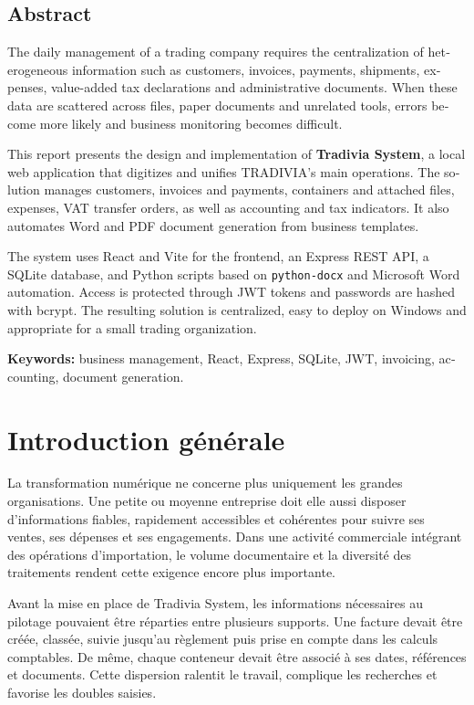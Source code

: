\documentclass[12pt,a4paper,oneside]{report}
\newcommand{\code}[1]{\texttt{#1}}
\begin{document}
\begin{otherlanguage}{english}
\chapter*{Abstract}
The daily management of a trading company requires the centralization of heterogeneous information such as customers, invoices, payments, shipments, expenses, value-added tax declarations and administrative documents. When these data are scattered across files, paper documents and unrelated tools, errors become more likely and business monitoring becomes difficult.

This report presents the design and implementation of \textbf{Tradivia System}, a local web application that digitizes and unifies TRADIVIA's main operations. The solution manages customers, invoices and payments, containers and attached files, expenses, VAT transfer orders, as well as accounting and tax indicators. It also automates Word and PDF document generation from business templates.

The system uses React and Vite for the frontend, an Express REST API, a SQLite database, and Python scripts based on \code{python-docx} and Microsoft Word automation. Access is protected through JWT tokens and passwords are hashed with bcrypt. The resulting solution is centralized, easy to deploy on Windows and appropriate for a small trading organization.

\textbf{Keywords:} business management, React, Express, SQLite, JWT, invoicing, accounting, document generation.
\end{otherlanguage}

\chapter*{Introduction générale}
La transformation numérique ne concerne plus uniquement les grandes organisations. Une petite ou moyenne entreprise doit elle aussi disposer d'informations fiables, rapidement accessibles et cohérentes pour suivre ses ventes, ses dépenses et ses engagements. Dans une activité commerciale intégrant des opérations d'importation, le volume documentaire et la diversité des traitements rendent cette exigence encore plus importante.

Avant la mise en place de Tradivia System, les informations nécessaires au pilotage pouvaient être réparties entre plusieurs supports. Une facture devait être créée, classée, suivie jusqu'au règlement puis prise en compte dans les calculs comptables. De même, chaque conteneur devait être associé à ses dates, références et documents. Cette dispersion ralentit le travail, complique les recherches et favorise les doubles saisies.
\end{document}
